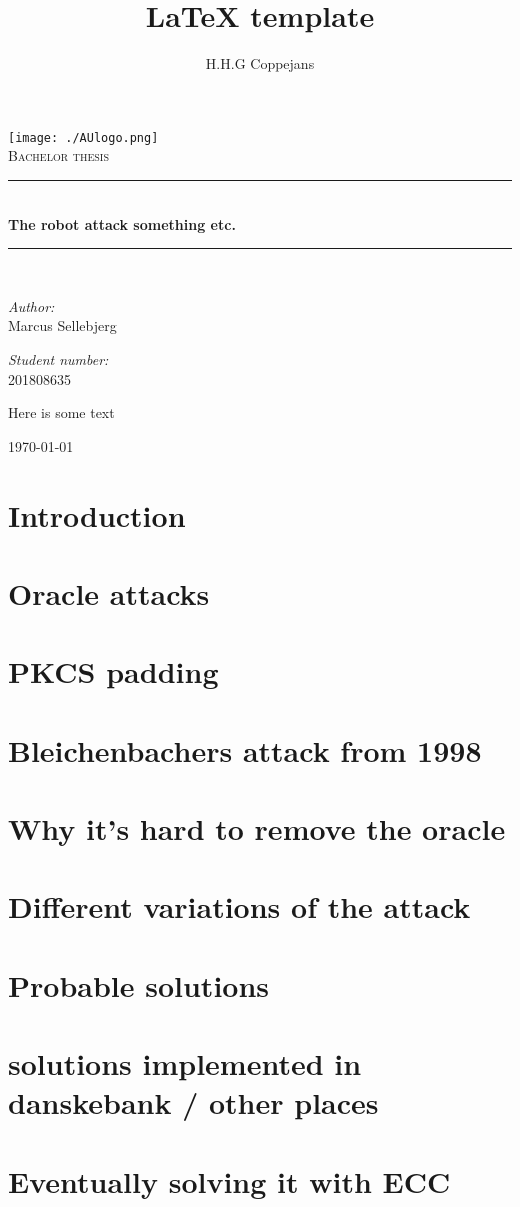 \documentclass[a4paper,12pt]{report}
\author{H.H.G Coppejans}
\title{LaTeX template}
\newcommand{\HRule}{\rule{\linewidth}{0.5mm}}
\begin{document}
\setlength{\parskip}{6pt}
\begin{titlepage}
\begin{center}
\texttt{[image: ./AUlogo.png]}\\[0.4cm]    
\textsc{\Large Bachelor thesis}\\[0.5cm]
\HRule \\[0.4cm]
{ \huge \bfseries The robot attack something etc.}\\[0.4cm]
\HRule \\[0.4cm]
\begin{minipage}{0.4\textwidth}
\begin{flushleft} \large
\emph{Author:}\\
Marcus Sellebjerg
\end{flushleft}
\end{minipage}
\begin{minipage}{0.4\textwidth}
\begin{flushright} \large
\emph{Student number:} \\
201808635
\end{flushright}
\end{minipage}
\vspace{10mm}
\begin{center}
    Here is some text
\end{center}
\vfill
{\large \today}
\end{center}
\end{titlepage}


\footnotesize
\normalsize
\setcounter{chapter}{1}
\renewcommand{\thesection}{\arabic{section}}

\tableofcontents
\section{Introduction}
\section{Oracle attacks}
\section{PKCS padding}
\section{Bleichenbachers attack from 1998}
\section{Why it's hard to remove the oracle}
\section{Different variations of the attack}
\section{Probable solutions}
\section{solutions implemented in danskebank / other places}
\section{Eventually solving it with ECC}

{} %

\end{document}
